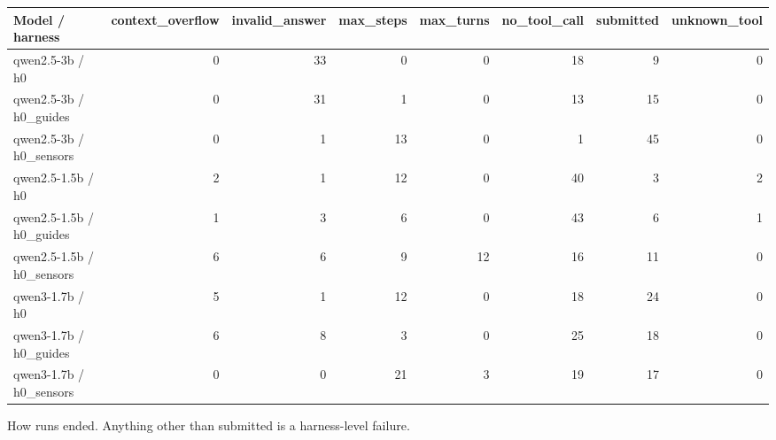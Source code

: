 {\small
\begin{adjustbox}{max width=\linewidth}
\begin{tabular}{lrrrrrrr}
\toprule
Model / harness & context\_overflow & invalid\_answer & max\_steps & max\_turns & no\_tool\_call & submitted & unknown\_tool \\
\midrule
qwen2.5-3b / h0 & 0 & 33 & 0 & 0 & 18 & 9 & 0 \\
qwen2.5-3b / h0\_guides & 0 & 31 & 1 & 0 & 13 & 15 & 0 \\
qwen2.5-3b / h0\_sensors & 0 & 1 & 13 & 0 & 1 & 45 & 0 \\
qwen2.5-1.5b / h0 & 2 & 1 & 12 & 0 & 40 & 3 & 2 \\
qwen2.5-1.5b / h0\_guides & 1 & 3 & 6 & 0 & 43 & 6 & 1 \\
qwen2.5-1.5b / h0\_sensors & 6 & 6 & 9 & 12 & 16 & 11 & 0 \\
qwen3-1.7b / h0 & 5 & 1 & 12 & 0 & 18 & 24 & 0 \\
qwen3-1.7b / h0\_guides & 6 & 8 & 3 & 0 & 25 & 18 & 0 \\
qwen3-1.7b / h0\_sensors & 0 & 0 & 21 & 3 & 19 & 17 & 0 \\
\bottomrule
\end{tabular}
\end{adjustbox}

\smallskip
{\footnotesize How runs ended. Anything other than submitted is a harness-level failure.\par}
}
